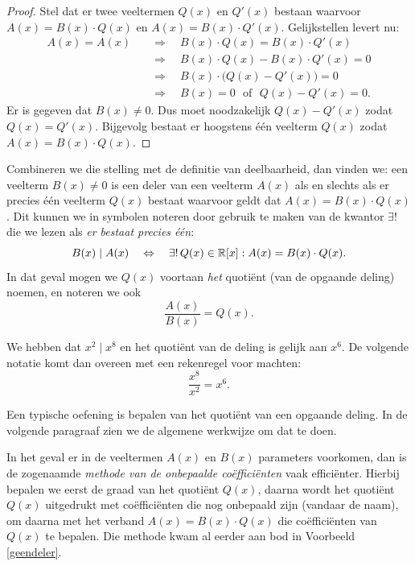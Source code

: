\documentclass{ximera}
\begin{document}
\begin{proof}

Stel dat er twee veeltermen $Q(x)$ en $Q'(x)$ bestaan waarvoor $A(x) = B(x)\cdot Q(x)$ en $A(x) = B(x)\cdot Q'(x)$. Gelijkstellen levert nu:
\begin{align*}
A(x) = A(x) \quad & \Rightarrow \quad B(x)\cdot Q(x) = B(x)\cdot Q'(x) \\
& \Rightarrow \quad B(x)\cdot Q(x) - B(x)\cdot Q'(x) = 0 \\
& \Rightarrow \quad B(x) \cdot \bigl(Q(x) - Q'(x) \bigr) = 0 \\
& \Rightarrow \quad B(x) = 0 \,\,\text{ of } \,\, Q(x) - Q'(x) = 0. 
\end{align*}
Er is gegeven dat $B(x) \neq 0$. Dus moet noodzakelijk $Q(x) - Q'(x)$ zodat $Q(x) = Q'(x)$. Bijgevolg bestaat er hoogstens \'e\'en veelterm $Q(x)$ zodat $A(x) = B(x)\cdot Q(x)$.

\end{proof}


Combineren we die stelling met de definitie van deelbaarheid, dan vinden we: een veelterm $B(x) \neq 0$ is een deler van een veelterm $A(x)$ als en slechts als er precies \'e\'en veelterm $Q(x)$ bestaat waarvoor geldt dat $A(x) = B(x)\cdot Q(x)$. Dit kunnen we in symbolen noteren door gebruik te maken van de kwantor $\exists!$ die we lezen als {\em er bestaat precies \'e\'en}:
\[
B(x) \mid A(x) \quad \Leftrightarrow \quad \exists! \, Q(x) \in \mathbb{R}[x]: A(x) = B(x)\cdot Q(x).
\] 
In dat geval mogen we $Q(x)$ voortaan {\em het} quoti\"ent (van de opgaande deling) noemen, en noteren we ook 
\[
\frac{A(x)}{B(x)} = Q(x).
\]

\begin{example} 
We hebben dat $x^2 \mid x^8$ en het quoti\"ent van de deling is gelijk aan $x^6$. De volgende notatie komt dan overeen met een rekenregel voor machten:
\[
\frac{x^8}{x^2} = x^6.
\]
\end{example} 


Een typische oefening is bepalen van het quoti\"ent van een opgaande deling. In de volgende paragraaf zien we de algemene werkwijze om dat te doen. 

In het geval er in de veeltermen $A(x)$ en $B(x)$ parameters voorkomen, dan is de zogenaamde {\em methode van de onbepaalde co\"effici\"enten} vaak effici\"enter. Hierbij bepalen we eerst de graad van het quoti\"ent $Q(x)$, daarna wordt het quoti\"ent $Q(x)$ uitgedrukt met co\"effici\"enten die nog onbepaald zijn (vandaar de naam), om daarna met het verband $A(x) = B(x) \cdot Q(x)$ die co\"effici\"enten van $Q(x)$ te bepalen. Die methode kwam al eerder aan bod in Voorbeeld \ref{geendeler}. 
\end{document}
